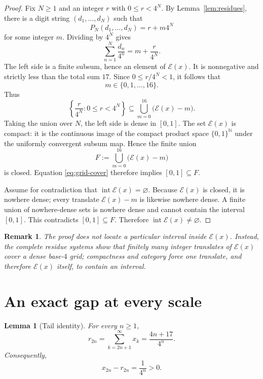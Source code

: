 \documentclass[11pt,letterpaper]{article}
\theoremstyle{metriqthm}
\newtheorem{lemma}[theorem]{Lemma}
\theoremstyle{metriqdef}
\newtheorem{remark}[theorem]{Remark}
\newcommand{\E}{\mathcal{E}}
\newcommand{\N}{\mathbb{N}}
\begin{document}
\begin{proof}
Fix $N\ge1$ and an integer $r$ with $0\le r<4^N$. By Lemma~\ref{lem:residues}, there is a digit string $(d_1,\ldots,d_N)$ such that
\[
  P_N(d_1,\ldots,d_N)=r+m4^N
\]
for some integer $m$. Dividing by $4^N$ gives
\begin{equation}\label{eq:grid-translate}
  \sum_{n=1}^{N}\frac{d_n}{4^n}
  =m+\frac{r}{4^N}.
\end{equation}
The left side is a finite subsum, hence an element of $\E(x)$. It is nonnegative and strictly less than the total sum $17$. Since $0\le r/4^N<1$, it follows that
\[
  m\in\{0,1,\ldots,16\}.
\]
Thus
\begin{equation}\label{eq:grid-cover}
  \left\{\frac{r}{4^N}:0\le r<4^N\right\}
  \subseteq
  \bigcup_{m=0}^{16}\bigl(\E(x)-m\bigr).
\end{equation}
Taking the union over $N$, the left side is dense in $[0,1]$. The set $\E(x)$ is compact: it is the continuous image of the compact product space $\{0,1\}^{\N}$ under the uniformly convergent subsum map. Hence the finite union
\[
  F:=\bigcup_{m=0}^{16}\bigl(\E(x)-m\bigr)
\]
is closed. Equation \eqref{eq:grid-cover} therefore implies $[0,1]\subseteq F$.

Assume for contradiction that $\operatorname{int}\E(x)=\varnothing$. Because $\E(x)$ is closed, it is nowhere dense; every translate $\E(x)-m$ is likewise nowhere dense. A finite union of nowhere-dense sets is nowhere dense and cannot contain the interval $[0,1]$. This contradicts $[0,1]\subseteq F$. Therefore $\operatorname{int}\E(x)\ne\varnothing$.
\end{proof}

\begin{remark}
The proof does not locate a particular interval inside $\E(x)$. Instead, the complete residue systems show that finitely many integer translates of $\E(x)$ cover a dense base-$4$ grid; compactness and category force one translate, and therefore $\E(x)$ itself, to contain an interval.
\end{remark}

\section{An exact gap at every scale}

\begin{lemma}[Tail identity]\label{lem:tail}
For every $n\ge1$,
\begin{equation}\label{eq:tail-identity}
  r_{2n}=\sum_{k=2n+1}^{\infty}x_k=\frac{4n+17}{4^n}.
\end{equation}
Consequently,
\begin{equation}\label{eq:gap-difference}
  x_{2n}-r_{2n}=\frac{1}{4^n}>0.
\end{equation}
\end{lemma}
\end{document}
